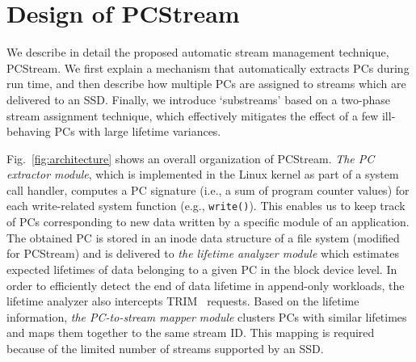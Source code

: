 \vspace{-7pt}
\section{Design of PCStream}
\vspace{-5pt}
We describe in detail the proposed automatic stream management technique, {\sf
PCStream}.  We first explain a mechanism that automatically extracts PCs during
run time, and then describe how multiple PCs are assigned to streams which are
delivered to an SSD.  Finally, we introduce `substreams' based on a two-phase
stream assignment technique, which effectively mitigates the effect of a few
ill-behaving PCs with large lifetime variances.



Fig.~\ref{fig:architecture} shows an overall organization of {\sf PCStream}.
\textit{The PC extractor module}, which is implemented in the Linux kernel as
part of a system call handler, computes a PC signature (i.e., a sum of program
counter values) for each write-related system function (e.g.,
\texttt{write()}).  This enables us to keep track of PCs corresponding to new
data written by a specific module of an application.  The obtained PC is stored
in an inode data structure of a file system (modified for \textsf{PCStream})
and is delivered to \textit{the lifetime analyzer module} which estimates
expected lifetimes of data belonging to a given PC in the block device level.
In order to efficiently detect the end of data lifetime in append-only
workloads, the lifetime analyzer also intercepts TRIM~\cite{TRIM} requests. %
Based on the lifetime information, \textit{the PC-to-stream
mapper module} clusters PCs with similar lifetimes and maps them together to
the same stream ID.  This mapping is required because of the limited number of
streams supported by an SSD.


\vspace{-10pt}
